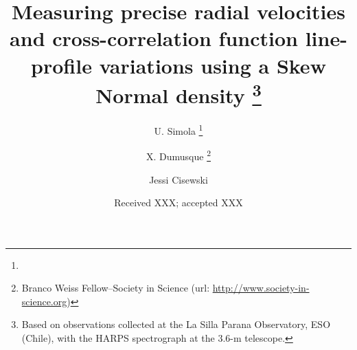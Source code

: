 \documentclass{aa}
\begin{document}
\title{Measuring precise radial velocities and cross-correlation function line-profile variations using a Skew Normal density
\thanks{Based on observations collected at the La Silla Parana Observatory,
ESO (Chile), with the HARPS spectrograph at the 3.6-m telescope.}}


\author{U. Simola 
	    \thanks{}
	    \and X. Dumusque
	    \thanks{Branco Weiss Fellow--Society in Science (url: \url{http://www.society-in-science.org})}    
	    \and Jessi Cisewski
	    }


\date{Received XXX; accepted XXX}
\end{document}
